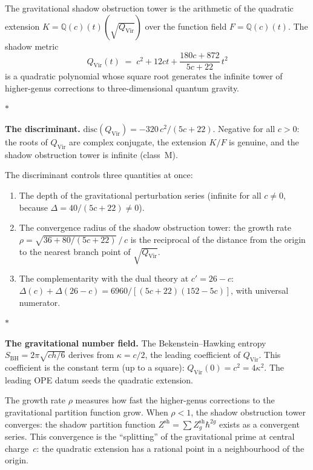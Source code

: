 \documentclass[11pt]{article}
\newcommand{\Q}{\mathbb{Q}}
\newcommand{\sep}{\bigskip\begin{center}$*$\end{center}\medskip}
\begin{document}
The gravitational shadow obstruction tower is the arithmetic of the quadratic
extension $K = \Q(c)(t)(\sqrt{Q_{\mathrm{Vir}}})$ over the
function field $F = \Q(c)(t)$.  The shadow metric
\[
  Q_{\mathrm{Vir}}(t)
  \;=\;
  c^2 + 12ct + \frac{180c + 872}{5c + 22}\,t^2
\]
is a quadratic polynomial whose square root generates the
infinite tower of higher-genus corrections to three-dimensional
quantum gravity.

\sep

\noindent\textbf{The discriminant.}\enspace
$\mathrm{disc}(Q_{\mathrm{Vir}}) = -320\,c^2/(5c{+}22)$.
Negative for all $c > 0$: the roots of $Q_{\mathrm{Vir}}$
are complex conjugate, the extension $K/F$ is genuine, and
the shadow obstruction tower is infinite (class~M).

The discriminant controls three quantities at once:
\begin{enumerate}[label=(\roman*),nosep]
\item The depth of the gravitational perturbation series
  (infinite for all $c \neq 0$, because $\Delta = 40/(5c{+}22)
  \neq 0$).
\item The convergence radius of the shadow obstruction tower: the growth
  rate $\rho = \sqrt{36 + 80/(5c{+}22)}\,/\,c$ is the reciprocal
  of the distance from the origin to the nearest branch point
  of $\sqrt{Q_{\mathrm{Vir}}}$.
\item The complementarity with the dual theory at $c' = 26 - c$:
  $\Delta(c) + \Delta(26{-}c) = 6960/[(5c{+}22)(152{-}5c)]$,
  with universal numerator.
\end{enumerate}

\sep

\noindent\textbf{The gravitational number field.}\enspace
The Bekenstein--Hawking entropy $S_{\mathrm{BH}} = 2\pi\sqrt{ch/6}$
derives from $\kappa = c/2$, the leading coefficient of
$Q_{\mathrm{Vir}}$.  This coefficient is the constant term
(up to a square): $Q_{\mathrm{Vir}}(0) = c^2 = 4\kappa^2$.
The leading OPE datum seeds the quadratic extension.

The growth rate $\rho$ measures how fast the higher-genus
corrections to the gravitational partition function grow.
When $\rho < 1$, the shadow obstruction tower converges: the shadow
partition function $Z^{\mathrm{sh}} = \sum Z_g^{\mathrm{sh}}
\hbar^{2g}$ exists as a convergent series.  This convergence
is the ``splitting'' of the gravitational prime at central
charge~$c$: the quadratic extension has a rational point in
a neighbourhood of the origin.
\end{document}
